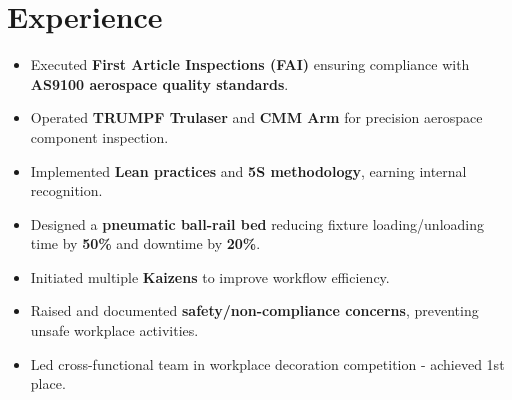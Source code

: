 \documentclass[11pt]{deedy-resume-openfont}
\begin{document}
\begin{minipage}[t]{0.61\textwidth}
\section{Experience} 
\begin{itemize}[leftmargin=*]
    \item Executed \textbf{First Article Inspections (FAI)} ensuring compliance with \textbf{AS9100 aerospace quality standards}.
    \item Operated \textbf{TRUMPF Trulaser} and \textbf{CMM Arm} for precision aerospace component inspection.
    \item Implemented \textbf{Lean practices} and \textbf{5S methodology}, earning internal recognition.
    \item Designed a \textbf{pneumatic ball-rail bed} reducing fixture loading/unloading time by \textbf{50\%} and downtime by \textbf{20\%}.
    \item Initiated multiple \textbf{Kaizens} to improve workflow efficiency.
    \item Raised and documented \textbf{safety/non-compliance concerns}, preventing unsafe workplace activities.
    \item Led cross-functional team in workplace decoration competition - achieved 1st place.
\end{itemize}
\sectionsep

%

\end{minipage} 
\end{document}
